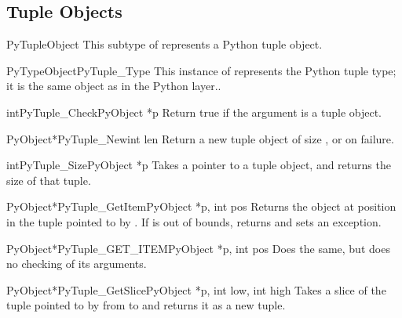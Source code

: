 \documentclass{manual}
\begin{document}
\subsection{Tuple Objects \label{tupleObjects}}

\begin{ctypedesc}{PyTupleObject}
This subtype of  represents a Python tuple object.
\end{ctypedesc}

\begin{cvardesc}{PyTypeObject}{PyTuple_Type}
This instance of  represents the Python tuple
type; it is the same object as  in the Python
layer..
\end{cvardesc}

\begin{cfuncdesc}{int}{PyTuple_Check}{PyObject *p}
Return true if the argument is a tuple object.
\end{cfuncdesc}

\begin{cfuncdesc}{PyObject*}{PyTuple_New}{int len}
Return a new tuple object of size , or \NULL{} on failure.
\end{cfuncdesc}

\begin{cfuncdesc}{int}{PyTuple_Size}{PyObject *p}
Takes a pointer to a tuple object, and returns the size
of that tuple.
\end{cfuncdesc}

\begin{cfuncdesc}{PyObject*}{PyTuple_GetItem}{PyObject *p, int pos}
Returns the object at position  in the tuple pointed
to by .  If  is out of bounds, returns \NULL{} and
sets an  exception.
\end{cfuncdesc}

\begin{cfuncdesc}{PyObject*}{PyTuple_GET_ITEM}{PyObject *p, int pos}
Does the same, but does no checking of its arguments.
\end{cfuncdesc}

\begin{cfuncdesc}{PyObject*}{PyTuple_GetSlice}{PyObject *p,
                                               int low, int high}
Takes a slice of the tuple pointed to by  from
 to  and returns it as a new tuple.
\end{cfuncdesc}
\end{document}

